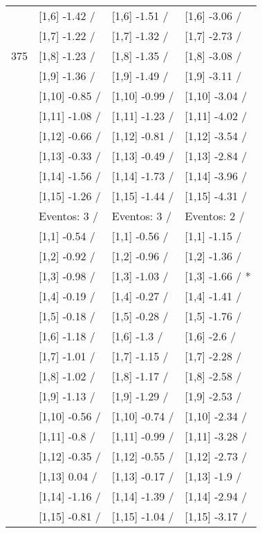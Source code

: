 \begin{table}
\begin{tabular}[t]{llll}
 & {}[1,6] -1.42  / & {}[1,6] -1.51  / & {}[1,6] -3.06  /\\
 & {}[1,7] -1.22  / & {}[1,7] -1.32  / & {}[1,7] -2.73  /\\
375 & {}[1,8] -1.23  / & {}[1,8] -1.35  / & {}[1,8] -3.08  /\\
\addlinespace
 & {}[1,9] -1.36  / & {}[1,9] -1.49  / & {}[1,9] -3.11  /\\
 & {}[1,10] -0.85  / & {}[1,10] -0.99  / & {}[1,10] -3.04  /\\
 & {}[1,11] -1.08  / & {}[1,11] -1.23  / & {}[1,11] -4.02  /\\
 & {}[1,12] -0.66  / & {}[1,12] -0.81  / & {}[1,12] -3.54  /\\
 & {}[1,13] -0.33  / & {}[1,13] -0.49  / & {}[1,13] -2.84  /\\
\addlinespace
 & {}[1,14] -1.56  / & {}[1,14] -1.73  / & {}[1,14] -3.96  /\\
 & {}[1,15] -1.26  / & {}[1,15] -1.44  / & {}[1,15] -4.31  /\\
 & Eventos:  3 / & Eventos:  3 / & Eventos:  2 /\\
 & {}[1,1] -0.54  / & {}[1,1] -0.56  / & {}[1,1] -1.15  /\\
 & {}[1,2] -0.92  / & {}[1,2] -0.96  / & {}[1,2] -1.36  /\\
\addlinespace
 & {}[1,3] -0.98  / & {}[1,3] -1.03  / & {}[1,3] -1.66  / *\\
 & {}[1,4] -0.19  / & {}[1,4] -0.27  / & {}[1,4] -1.41  /\\
 & {}[1,5] -0.18  / & {}[1,5] -0.28  / & {}[1,5] -1.76  /\\
 & {}[1,6] -1.18  / & {}[1,6] -1.3  / & {}[1,6] -2.6  /\\
 & {}[1,7] -1.01  / & {}[1,7] -1.15  / & {}[1,7] -2.28  /\\
\addlinespace
500 & {}[1,8] -1.02  / & {}[1,8] -1.17  / & {}[1,8] -2.58  /\\
 & {}[1,9] -1.13  / & {}[1,9] -1.29  / & {}[1,9] -2.53  /\\
 & {}[1,10] -0.56  / & {}[1,10] -0.74  / & {}[1,10] -2.34  /\\
 & {}[1,11] -0.8  / & {}[1,11] -0.99  / & {}[1,11] -3.28  /\\
 & {}[1,12] -0.35  / & {}[1,12] -0.55  / & {}[1,12] -2.73  /\\
\addlinespace
 & {}[1,13] 0.04  / & {}[1,13] -0.17  / & {}[1,13] -1.9  /\\
 & {}[1,14] -1.16  / & {}[1,14] -1.39  / & {}[1,14] -2.94  /\\
 & {}[1,15] -0.81  / & {}[1,15] -1.04  / & {}[1,15] -3.17  /\\
\bottomrule
\end{tabular}
\end{table}
